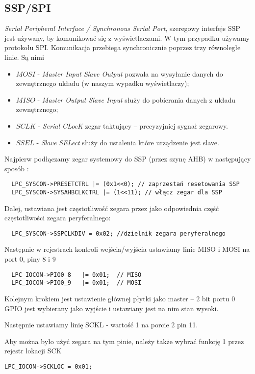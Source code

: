 \documentclass[a4paper,12pt,twoside]{article}
\theoremstyle{plain}
\theoremstyle{definition}
\theoremstyle{remark}
\begin{document}
\subsection{SSP/SPI}
\textit{Serial Peripheral Interface / Synchronous Serial Port}, szeregowy interfejs SSP jest używany, by komunikować się z wyświetlaczami. W tym przypadku używamy protokołu SPI. Komunikacja przebiega synchronicznie poprzez trzy równoległe linie. Są nimi
\begin{itemize}
	\item $MOSI$ - \textit{Master Input Slave Output} pozwala na wysyłanie danych do zewnętrznego układu (w naszym wypadku wyświetlaczy);
	\item $MISO$ - \textit{Master Output Slave Input} służy do pobierania danych z układu zewnętrznego;
	\item $SCLK$ - \textit{Serial CLocK} zegar taktujący -- precyzyjniej sygnał zegarowy.
	\item $SSEL$ - \textit{Slave SELect} służy do ustalenia które urządzenie jest slave.
\end{itemize} 
	Najpierw podłączamy zegar systemowy do SSP (przez szynę AHB) w następujący sposób \cite{INST}:
\begin{verbatim}
  LPC_SYSCON->PRESETCTRL |= (0x1<<0); // zaprzestań resetowania SSP
  LPC_SYSCON->SYSAHBCLKCTRL |= (1<<11); // włącz zegar dla SSP
\end{verbatim}
	Dalej, ustawiana jest częstotliwość zegara przez jako odpowiednia część częstotliwości zegara peryferalnego:
\begin{verbatim}
  LPC_SYSCON->SSPCLKDIV = 0x02;	//dzielnik zegara peryferalnego
\end{verbatim}

Następnie w rejestrach kontroli wejścia/wyjścia ustawiamy linie MISO i MOSI na port 0, piny 8 i 9
\begin{verbatim}
  LPC_IOCON->PIO0_8   |= 0x01;	// MISO
  LPC_IOCON->PIO0_9   |= 0x01;	// MOSI
  \end{verbatim}
  Kolejnym krokiem jest ustawienie głównej płytki jako master -- 2 bit portu 0 GPIO jest wybierany jako wyjście i ustawiany jest na nim stan wysoki. 
  
Następnie ustawiamy linię SCKL - wartość 1 na porcie 2 pin 11.

Aby można było użyć zegara na tym pinie, należy także wybrać funkcję 1 przez rejestr lokacji SCK
\begin{verbatim}
LPC_IOCON->SCKLOC = 0x01;
\end{verbatim}
\end{document}
